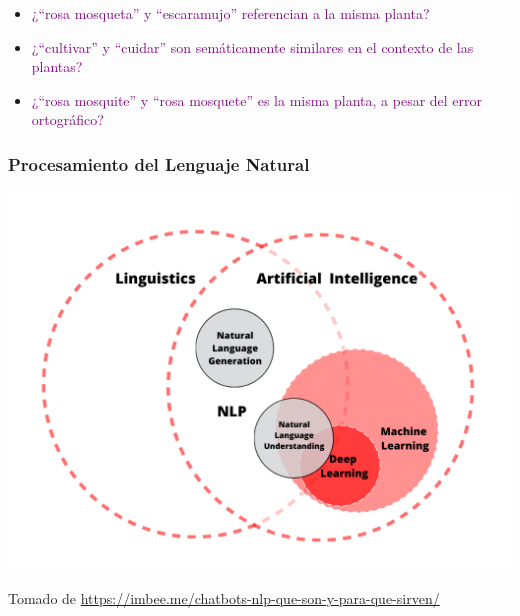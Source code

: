 \documentclass[
10pt, %
aspectratio=169, %
]{beamer}
\begin{document}
\begin{frame}
\begin{enumerate}
\begin{itemize}
				\pause
				\item \textcolor{purple}{¿``rosa mosqueta'' y ``escaramujo'' referencian a la misma planta?}
				
				\pause
				\item \textcolor{purple}{¿``cultivar'' y ``cuidar'' son semáticamente similares en el contexto de las plantas?}
				
				\pause
				\item \textcolor{purple}{¿``rosa mosquite'' y ``rosa mosquete'' es la misma planta, a pesar del error ortográfico?}
			\end{itemize}
			
		\end{enumerate}
		
	\end{frame}
	
	
	\begin{frame}
		
		\frametitle{Procesamiento del Lenguaje Natural}
		
		\centering
		\includegraphics[scale=0.37]{Diagrama-IA.png} 
		
		{\scriptsize Tomado de \url{https://imbee.me/chatbots-nlp-que-son-y-para-que-sirven/}}
	
	\end{frame}
	
	
	
\end{document}
